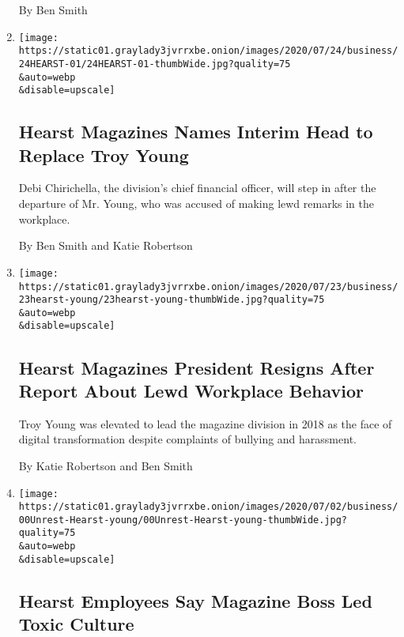 \begin{enumerate}
  By Ben Smith
\item
  \href{/2020/07/24/business/media/hearst-troy-young-replacement-president.html}{}

  \texttt{[image: https://static01.graylady3jvrrxbe.onion/images/2020/07/24/business/24HEARST-01/24HEARST-01-thumbWide.jpg?quality=75\\\&auto=webp\\\&disable=upscale]}

  \hypertarget{hearst-magazines-names-interim-head-to-replace-troy-young}{%
  \subsection{Hearst Magazines Names Interim Head to Replace Troy
  Young}\label{hearst-magazines-names-interim-head-to-replace-troy-young}}

  Debi Chirichella, the division's chief financial officer, will step in
  after the departure of Mr. Young, who was accused of making lewd
  remarks in the workplace.

  By Ben Smith and Katie Robertson
\item
  \href{/2020/07/23/business/troy-young-hearst-magazines.html}{}

  \texttt{[image: https://static01.graylady3jvrrxbe.onion/images/2020/07/23/business/23hearst-young/23hearst-young-thumbWide.jpg?quality=75\\\&auto=webp\\\&disable=upscale]}

  \hypertarget{hearst-magazines-president-resigns-after-report-about-lewd-workplace-behavior}{%
  \subsection{Hearst Magazines President Resigns After Report About Lewd
  Workplace
  Behavior}\label{hearst-magazines-president-resigns-after-report-about-lewd-workplace-behavior}}

  Troy Young was elevated to lead the magazine division in 2018 as the
  face of digital transformation despite complaints of bullying and
  harassment.

  By Katie Robertson and Ben Smith
\item
  \href{/2020/07/22/business/media/hearst-harassment-troy-young.html}{}

  \texttt{[image: https://static01.graylady3jvrrxbe.onion/images/2020/07/02/business/00Unrest-Hearst-young/00Unrest-Hearst-young-thumbWide.jpg?quality=75\\\&auto=webp\\\&disable=upscale]}

  \hypertarget{hearst-employees-say-magazine-boss-led-toxic-culture}{%
  \subsection{Hearst Employees Say Magazine Boss Led Toxic
  Culture}\label{hearst-employees-say-magazine-boss-led-toxic-culture}}


\end{enumerate}
